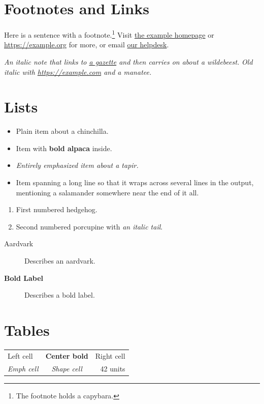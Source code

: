 \documentclass[11pt]{article}
\begin{document}
\section{Footnotes and Links}
Here is a sentence with a footnote.\footnote{The footnote holds a capybara.}
Visit \href{https://example.com/path}{the example homepage} or
\url{https://example.org} for more, or email \href{mailto:a@b.c}{our helpdesk}.

\textit{An italic note that links to \href{https://example.net/x}{a gazette} and
then carries on about a wildebeest.} {\it Old italic with \url{https://example.com} and
a manatee.} 

\section{Lists}
\begin{itemize}
  \item Plain item about a chinchilla.
  \item Item with \textbf{bold alpaca} inside.
  \item \emph{Entirely emphasized item about a tapir.}
  \item Item spanning a long line so that it wraps across several lines in the
        output, mentioning a salamander somewhere near the end of it all.
\end{itemize}

\begin{enumerate}
  \item First numbered hedgehog.
  \item Second numbered porcupine with {\itshape an italic tail}.
\end{enumerate}

\begin{description}
  \item[Aardvark] Describes an aardvark.
  \item[\textbf{Bold Label}] Describes a bold label.
\end{description}

\section{Tables}
\begin{tabular}{|l|c|r|}
  \hline
  Left cell & \textbf{Center bold} & Right cell \\
  \emph{Emph cell} & {\itshape Shape cell} & 42 units \\
  \hline
\end{tabular}
\end{document}
